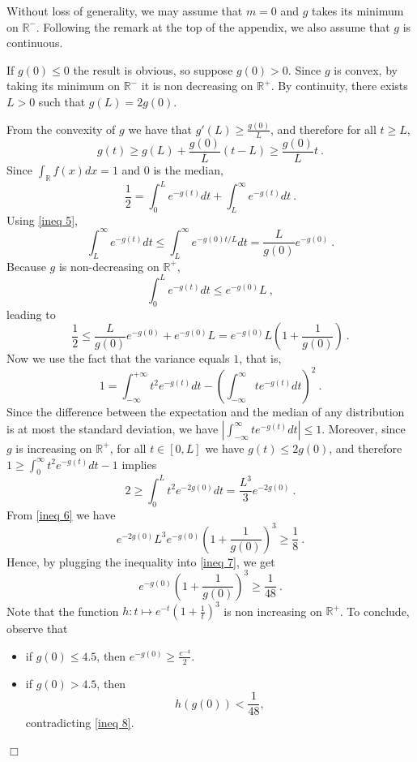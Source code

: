 \documentclass[12pt]{article}
\newcommand{\R}{\mathbb{R}}
\newcommand{\qed}{\hfill $\Box$}
\newenvironment{proof}{\par\noindent{\bf Proof:}}{\qed \par\medskip\noindent}
\begin{document}
\begin{proof}
Without loss of generality, we may assume that $m=0$ and $g$ takes
its minimum on $\R^-$. Following the remark at the top of the appendix, we also assume that $g$ is continuous.

If $g(0)\leq 0$ the result is obvious, so suppose $g(0)>0$.
Since $g$ is convex, by taking its minimum on $\R^-$ it is non
decreasing on $\R^+$.
By continuity, there exists $L>0$ such that
$g(L)=2g(0)$.

From the convexity of $g$ we have that $g'(L)\geq \frac{g(0)}{L}$, and
therefore  for all $t \geq L$, 
\begin{equation}\label{ineq 5}
g(t)\geq g(L)+\frac{g(0)}{L}(t-L)\geq \frac{g(0)}{L}t~.
\end{equation}
Since $\int_{\R} f(x) dx =1$ and $0$ is the median,
\[
  \frac{1}{2}=\int_0^L e^{-g(t)}dt+\int_L^{\infty} e^{-g(t)}dt~.
\]
Using \eqref{ineq 5},
\[
  \int_L^{\infty} e^{-g(t)}dt \leq \int_L^{\infty}
  e^{-g(0)t/L}dt=\frac{L}{g(0)}e^{-g(0)}~.
\]
Because $g$ is non-decreasing on $\R^+$, 
\[
  \int_0^L e^{-g(t)}dt \leq e^{-g(0)}L~,
\]  
leading to
\begin{equation}\label{ineq 6}
\frac{1}{2} \leq \frac{L}{g(0)}e^{-g(0)}+e^{-g(0)}L=e^{-g(0)}L\left(1+\frac{1}{g(0)}\right)~.
\end{equation}
Now we use the fact that the variance equals $1$, that is,
\[
  1=\int_{-\infty}^{+\infty}t^2e^{-g(t)}dt -
  \left(\int_{-\infty}^{\infty}t e^{-g(t)}dt\right)^2~.
\]
Since the difference between the expectation and the median of any
distribution is at most the standard deviation, we have
$|\int_{-\infty}^{\infty}t e^{-g(t)}dt|\le 1$.
Moreover,  since $g$ is increasing on $\R^+$, for all $t \in [0,L]$ we
have $g(t)\leq 2g(0)$, and therefore $1 \geq
\int_0^{\infty}t^2e^{-g(t)}dt -1$
implies
\begin{equation}\label{ineq 7}
2 \geq \int_0^L t^2 e^{-2g(0)}dt = \frac{L^3}{3}e^{-2g(0)}~.
\end{equation}
From \eqref{ineq 6} we have
\[
  e^{-2g(0)}L^3  e^{-g(0)}\left(1+\frac{1}{g(0)}\right)^3 \geq
  \frac{1}{8}~.
\]
Hence, by plugging the inequality into \eqref{ineq 7}, we get
\begin{equation}\label{ineq 8}
e^{-g(0)}\left(1+\frac{1}{g(0)}\right)^3 \geq \frac{1}{48}~.
\end{equation}
Note that the function $h:t \mapsto e^{-t}\left(1+\frac{1}{t}\right)^3$
is non increasing on $\R^+ $.
To conclude, observe that
\begin{itemize}
\item if $g(0)\leq 4.5$, then $e^{-g(0)}\geq \frac{e^{-4}}{2}$.
\item if $g(0)>4.5$, then
$$ h(g(0)) < \frac{1}{48},$$
contradicting \eqref{ineq 8}.
\end{itemize}
\end{proof}
\end{document}
